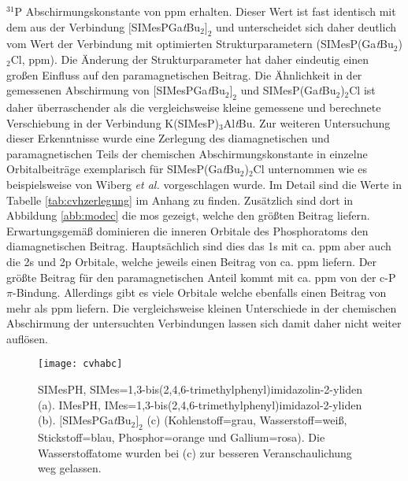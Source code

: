 $^{31}$P Abschirmungskonstante von \unit[336]{ppm} erhalten. Dieser Wert ist fast identisch mit dem aus der Verbindung $[$SIMesPGa\textit{t}Bu$_2]_2$ und unterscheidet sich daher deutlich vom Wert der Verbindung mit optimierten Strukturparametern (SIMesP(Ga\textit{t}Bu$_2$)$_2$Cl, \unit[380]{ppm}). Die Änderung der Strukturparameter hat daher eindeutig einen großen Einfluss auf den paramagnetischen Beitrag. Die Ähnlichkeit in der gemessenen Abschirmung von $[$SIMesPGa\textit{t}Bu$_2]_2$ und SIMesP(Ga\textit{t}Bu$_2$)$_2$Cl ist daher überraschender als die vergleichsweise kleine gemessene und berechnete Verschiebung in der Verbindung K(SIMesP)$_3$Al\textit{t}Bu.
Zur weiteren Untersuchung dieser Erkenntnisse wurde eine Zerlegung des diamagnetischen und paramagnetischen Teils der chemischen Abschirmungskonstante in einzelne Orbitalbeiträge exemplarisch für SIMesP(Ga\textit{t}Bu$_2$)$_2$Cl unternommen wie es beispielsweise von Wiberg \textit{et al.}\supercite{wiberg1998nmr} vorgeschlagen wurde. Im Detail sind die Werte in Tabelle \ref{tab:cvhzerlegung} im Anhang zu finden. Zusätzlich sind dort in Abbildung \ref{abb:modec} die \acp{mo} gezeigt, welche den größten Beitrag liefern. Erwartungsgemäß dominieren die inneren Orbitale des Phosphoratoms den diamagnetischen Beitrag. Hauptsächlich sind dies das 1s mit ca. \unit[500]{ppm} aber auch die 2s und 2p Orbitale, welche jeweils einen Beitrag von ca. \unit[100]{ppm} liefern. Der größte Beitrag für den paramagnetischen Anteil kommt mit ca. \unit[-180]{ppm} von der c-P $\pi$-Bindung. Allerdings gibt es viele Orbitale welche ebenfalls einen Beitrag von mehr als \unit[10]{ppm} liefern. Die vergleichsweise kleinen Unterschiede in der chemischen Abschirmung der untersuchten Verbindungen lassen sich damit daher nicht weiter auflösen.

\begin{figure}[ht!]
	\centering
	\texttt{[image: cvhabc]}
	\captionsetup{figurewithin = chapter}
	\captionsetup{font=small, labelfont=bf}\caption[{Abbildung von SIMesPH, IMesPH und $[$SIMesPGa\textit{t}Bu$_2]_2$}]{ SIMesPH, SIMes=1,3-bis(2,4,6-tri\-me\-thyl\-phe\-nyl)imi\-da\-zo\-lin-2-yli\-den (a). IMesPH, IMes=1,3-bis(2,4,6-tri\-me\-thyl\-phe\-nyl)imi\-da\-zol-2-yli\-den (b). $[$SIMesPGa\textit{t}Bu$_2]_2$ (c) (Kohlenstoff=grau, Wasserstoff=weiß, Stickstoff=blau, Phosphor=orange und Gallium=rosa). Die Wasserstoffatome wurden bei (c) zur besseren Veranschaulichung weg gelassen.}
\label{abb:cvhabc}
\end{figure}

